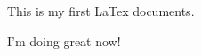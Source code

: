 \documentclass[11pt]{article}
\begin{document}
This is my first LaTex documents.

I'm doing great now!
\end{document}
